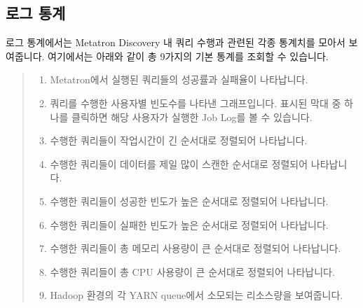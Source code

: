 \documentclass[letterpaper,10pt,english]{sphinxmanual}
\begin{document}
\subsection{로그 통계}
\label{\detokenize{discovery/part02/data_monitoring:id2}}
로그 통계에서는 Metatron Discovery 내 쿼리 수행과 관련된 각종 통계치를 모아서 보여줍니다. 여기에서는 아래와 같이 총 9가지의 기본 통계를 조회할 수 있습니다.
\begin{quote}

\begin{figure}[H]
\centering

\noindent{}
\end{figure}
\begin{enumerate}
\def\theenumi{\arabic{enumi}}
\def\labelenumi{\theenumi .}
\makeatletter\def\p@enumii{\p@enumi \theenumi .}\makeatother
\item {} 
 Metatron에서 실행된 쿼리들의 성공률과 실패율이 나타납니다.

\item {} 
 쿼리를 수행한 사용자별 빈도수를 나타낸 그래프입니다. 표시된 막대 중 하나를 클릭하면 해당 사용자가 실행한 Job Log를 볼 수 있습니다.

\item {} 
 수행한 쿼리들이 작업시간이 긴 순서대로 정렬되어 나타납니다.

\item {} 
 수행한 쿼리들이 데이터를 제일 많이 스캔한 순서대로 정렬되어 나타납니다.

\item {} 
 수행한 쿼리들이 성공한 빈도가 높은 순서대로 정렬되어 나타납니다.

\item {} 
 수행한 쿼리들이 실패한 빈도가 높은 순서대로 정렬되어 나타납니다.

\item {} 
 수행한 쿼리들이 총 메모리 사용량이 큰 순서대로 정렬되어 나타납니다.

\item {} 
 수행한 쿼리들이 총 CPU 사용량이 큰 순서대로 정렬되어 나타납니다.

\item {} 
 Hadoop 환경의 각 YARN queue에서 소모되는 리소스량을 보여줍니다.

\end{enumerate}
\end{quote}
\end{document}
